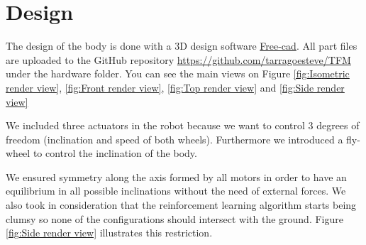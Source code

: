 \section{Design}
The design of the body is done with a  3D design software \href{https://www.freecadweb.org/}{Free-cad}. All part files are uploaded to the GitHub repository \url{https://github.com/tarragoesteve/TFM} under the hardware folder. You can see the main views on Figure \ref{fig:Isometric render view}, \ref{fig:Front render view}, \ref{fig:Top render view} and \ref{fig:Side render view}

We included three actuators in the robot because we want to control 3 degrees of freedom (inclination and speed of both wheels). Furthermore we introduced a fly-wheel to control the inclination of the body.  

We ensured symmetry along the axis formed by all motors in order to have an equilibrium in all possible inclinations without the need of external forces. We also took in consideration that the reinforcement learning algorithm starts being clumsy so none of the configurations should intersect with the ground. Figure \ref{fig:Side render view} illustrates this restriction.   

